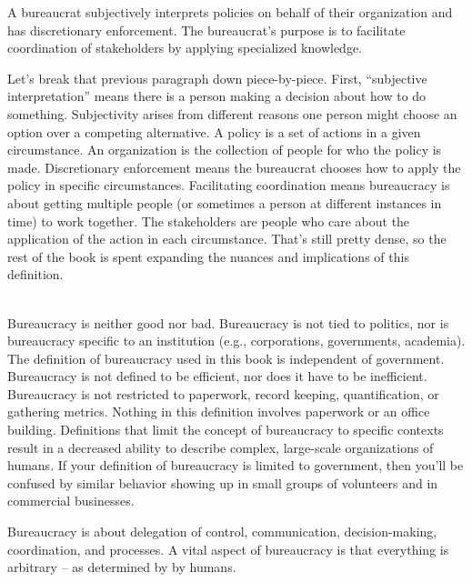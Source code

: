 A \gls{bureaucrat} 
\marginpar{[Glossary]}
subjectively interprets policies on behalf of their organization and has discretionary enforcement. The bureaucrat's purpose is to facilitate coordination of stakeholders by applying specialized knowledge. 

Let's break that previous paragraph down piece-by-piece. First, ``subjective interpretation'' means there is a person making a decision about how to do something. Subjectivity arises from different reasons one person might choose an option over a competing alternative.  A \gls{policy} 
\marginpar{[Glossary]}
is a set of actions in a given circumstance. An \gls{organization} is the collection of people for who the policy is made. Discretionary enforcement means the bureaucrat chooses how to apply the policy in specific circumstances. Facilitating coordination means bureaucracy is about getting multiple people (or sometimes a person at different instances in time) to work together. The stakeholders are people who care about the application of the action in each circumstance.  That's still pretty dense, so the rest of the book is spent expanding the nuances and implications of this definition.

\ \\

Bureaucracy is neither good nor bad. Bureaucracy is not tied to politics, nor is bureaucracy specific to an institution (e.g., corporations, governments, academia). The definition of bureaucracy used in this book is independent of government. Bureaucracy is not defined to be efficient, nor does it have to be inefficient. Bureaucracy is not restricted to paperwork, record keeping, quantification, or gathering metrics. Nothing in this definition involves paperwork or an office building. Definitions that limit the concept of bureaucracy to specific contexts result in a decreased ability to describe complex, large-scale organizations of humans. If your definition of bureaucracy is limited to government, then you'll be confused by similar behavior showing up in small groups of volunteers and in commercial businesses.

Bureaucracy is about delegation of control, communication, decision-making, coordination, and processes. 
A vital aspect of bureaucracy is that everything is arbitrary -- as determined by by humans.



